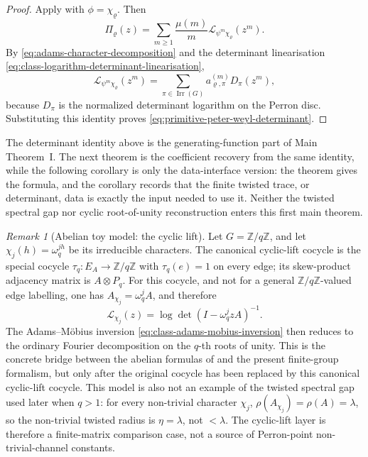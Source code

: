 \documentclass[11pt,a4paper]{amsart}
\theoremstyle{plain}
\theoremstyle{definition}
\theoremstyle{remark}
\newtheorem{remark}[theorem]{Remark}
\DeclareMathOperator{\Irr}{Irr}
\newcommand{\ZZ}{\mathbb{Z}}
\begin{document}
\begin{proof}
  Apply  with
  \(\phi=\chi_\varrho\). Then
  \[
    \Pi_\varrho(z)
    =
    \sum_{m\ge 1}\frac{\mu(m)}{m}
      \mathcal L_{\psi^m\chi_\varrho}(z^m).
  \]
  By \eqref{eq:adams-character-decomposition} and the determinant
  linearisation \eqref{eq:class-logarithm-determinant-linearisation},
  \[
    \mathcal L_{\psi^m\chi_\varrho}(z^m)
    =
    \sum_{\pi\in\Irr(G)}
      a_{\varrho,\pi}^{(m)}
      D_\pi(z^m),
  \]
  because \(D_\pi\) is the normalized determinant logarithm on the
  Perron disc.
  Substituting this identity proves
  \eqref{eq:primitive-peter-weyl-determinant}.
\end{proof}

\noindent
The determinant identity above is the generating-function part of Main
Theorem~I.  The next theorem is the coefficient recovery from the same
identity, while the following corollary is only the data-interface version:
the theorem gives the formula, and the corollary records that the finite
twisted trace, or determinant, data is exactly the input needed to use it.
Neither the twisted spectral gap nor cyclic root-of-unity reconstruction
enters this first main theorem.

\begin{remark}[Abelian toy model: the cyclic lift]
  \label{rem:abelian-toy-model-cyclic}
  Let \(G=\ZZ/q\ZZ\), and let \(\chi_j(h)=\omega_q^{jh}\) be its
  irreducible characters. The canonical cyclic-lift cocycle is the
  special cocycle \(\tau_q:E_A\to\ZZ/q\ZZ\) with
  \(\tau_q(e)=1\) on every edge; its skew-product adjacency matrix is
  \(A\otimes P_q\). For this cocycle, and not for a general
  \(\ZZ/q\ZZ\)-valued edge labelling, one has
  \(A_{\chi_j}=\omega_q^jA\), and therefore
  \[
    \mathcal L_{\chi_j}(z)=\log\det(I-\omega_q^j zA)^{-1}.
  \]
  The Adams--M\"obius inversion
  \eqref{eq:class-adams-mobius-inversion} then reduces to the ordinary
  Fourier decomposition on the \(q\)-th roots of unity. This is the
  concrete bridge between the abelian formulas of
   and the present finite-group formalism, but
  only after the original cocycle has been replaced by this canonical
  cyclic-lift cocycle.
  This model is also not an example of the twisted spectral gap used
  later when \(q>1\): for every non-trivial character \(\chi_j\),
  \(\rho(A_{\chi_j})=\rho(A)=\lambda\), so the non-trivial twisted
  radius is \(\eta=\lambda\), not \(<\lambda\). The cyclic-lift layer is
  therefore a finite-matrix comparison case, not a source of
  Perron-point non-trivial-channel constants.
\end{remark}
\end{document}
